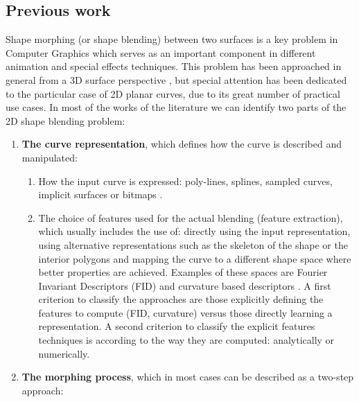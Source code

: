 \documentclass{ipol}
\begin{document}
\subsection{Previous work}
Shape morphing (or shape blending) between two surfaces is a key problem in Computer Graphics which serves as an important component in different animation and special effects techniques.
This problem has been approached in general from a 3D surface perspective \cite{math:computer_graphics:alexa:2000:as_rigid_as_possible_shape_interpolation}, but special attention has been dedicated to the particular case of 2D planar curves, due to its great number of practical use cases.
In most of the works of the literature we can identify two parts of the 2D shape blending problem: 
  
\begin{enumerate}
    \item \textbf{The curve representation}, which defines how the curve is described and manipulated:
        \begin{enumerate}
            \item How the input curve is expressed: poly-lines, splines, sampled curves, implicit surfaces or bitmaps .
            \item The choice of features used for the actual blending (feature extraction), which usually includes the use of:
            directly using the input representation, using alternative representations such as the skeleton of the shape \cite{computer_science:computer_graphics:shapira:1995:shape_blending_using_the_star_skeleton} or the interior polygons and mapping the curve to a different shape space where better properties are achieved. Examples of these spaces are Fourier Invariant Descriptors (FID) \cite{math:computer_graphics:curve_blending:ghorbel:2020:fast_blending_of_planar_shapes} and curvature based descriptors \cite{im_proc:curve_interpolation:elber:07:metamorphosis_planar_parametric_curves} . A first criterion to classify the approaches are those explicitly defining the features to compute (FID, curvature) versus those directly learning a representation. A second criterion to classify the explicit features techniques is according to the way they are computed: analytically or numerically.
        \end{enumerate}
    \item \textbf{The morphing process}, which in most cases can be described as a two-step approach:
        \begin{enumerate}

\end{enumerate}
\end{enumerate}
\end{document}
